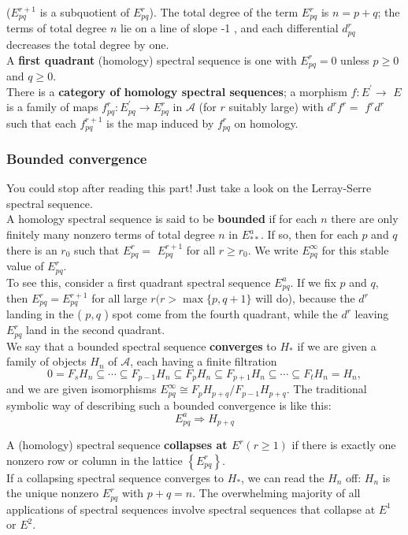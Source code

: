 \begin{example}
($E_{p q}^{r+1}$ is a subquotient of $E_{p q}^r$). The total degree of the term $E_{p q}^r$ is $n=p+q$; the terms of total degree $n$ lie on a line of slope -1 , and each differential $d_{p q}^r$ decreases the total degree by one.\\
A \textbf{first quadrant} (homology) spectral sequence is one with $E_{p q}^r=0$ unless $p \geq 0$ and $q \geq 0$.\\

There is a \textbf{category of homology spectral sequences}; a morphism $f: E^{\prime} \rightarrow$ $E$ is a family of maps $f_{p q}^r: E_{p q}^{\prime} \rightarrow E_{p q}^r$ in $\mathcal{A}$ (for $r$ suitably large) with $d^r f^r=$ $f^r d^r$ such that each $f_{p q}^{r+1}$ is the map induced by $f_{p q}^r$ on homology.

\subsubsection{Bounded convergence}
You could stop after reading this part! Just take a look on the Lerray-Serre spectral sequence.\\

A homology spectral sequence is said to be \textbf{bounded} if for each $n$ there are only finitely many nonzero terms of total degree $n$ in $E_{* *}^a$. If so, then for each $p$ and $q$ there is an $r_0$ such that $E_{p q}^r=$ $E_{p q}^{r+1}$ for all $r \geq r_0$. We write $E_{p q}^{\infty}$ for this stable value of $E_{p q}^r$.\\
To see this, consider a first quadrant spectral sequence $E^a _{pq}$. If we fix $p$ and $q$, then $E_{p q}^r=E_{p q}^{r+1}$ for all large $r(r>\max \{p, q+1\}$ will do), because the $d^r$ landing in the ( $p, q$ ) spot come from the fourth quadrant, while the $d^r$ leaving $E_{p q}^r$ land in the second quadrant.\\ 

We say that a bounded spectral sequence \textbf{converges} to $H_*$ if we are given a family of objects $H_n$ of $\mathcal{A}$, each having a finite filtration
$$
0=F_s H_n \subseteq \cdots \subseteq F_{p-1} H_n \subseteq F_p H_n \subseteq F_{p+1} H_n \subseteq \cdots \subseteq F_t H_n=H_n,
$$
and we are given isomorphisms $E_{p q}^{\infty} \cong F_p H_{p+q} / F_{p-1} H_{p+q}$. The traditional symbolic way of describing such a bounded convergence is like this:
$$
E_{p q}^a \Rightarrow H_{p+q}
$$

A (homology) spectral sequence \textbf{collapses at $E^r(r \geq 1)$ } if there is exactly one nonzero row or column in the lattice $\left\{E_{p q}^r\right\}$.\\
If a collapsing spectral sequence converges to $H_*$, we can read the $H_n$ off: $H_n$ is the unique nonzero $E_{p q}^r$ with $p+q=n$. The overwhelming majority of all applications of spectral sequences involve spectral sequences that collapse at $E^1$ or $E^2$.\\




\end{example}

